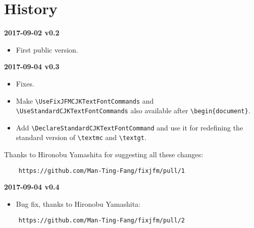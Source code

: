 \documentclass[a4paper]{article}
\newenvironment{history}[1]%
  {\noindent\textbf{#1}\begin{itemize}}%
  {\end{itemize}}
\begin{document}
\section{History}

\begin{history}{2017-09-02 v0.2}
\item First public version.
\end{history}

\begin{history}{2017-09-04 v0.3}
\item Fixes.
\item Make \verb|\UseFixJFMCJKTextFontCommands| and
  \verb|\UseStandardCJKTextFontCommands| also available after
  \verb|\begin{document}|.
\item Add \verb|\DeclareStandardCJKTextFontCommand| and use it for redefining
  the standard version of \verb|\textmc| and \verb|\textgt|.
\end{history}
Thanks to Hironobu Yamashita for suggesting all these changes:
\begin{verbatim}
    https://github.com/Man-Ting-Fang/fixjfm/pull/1
\end{verbatim}

\begin{history}{2017-09-04 v0.4}
\item Bug fix, thanks to Hironobu Yamashita:
\end{history}
\begin{verbatim}
    https://github.com/Man-Ting-Fang/fixjfm/pull/2
\end{verbatim}
\end{document}
